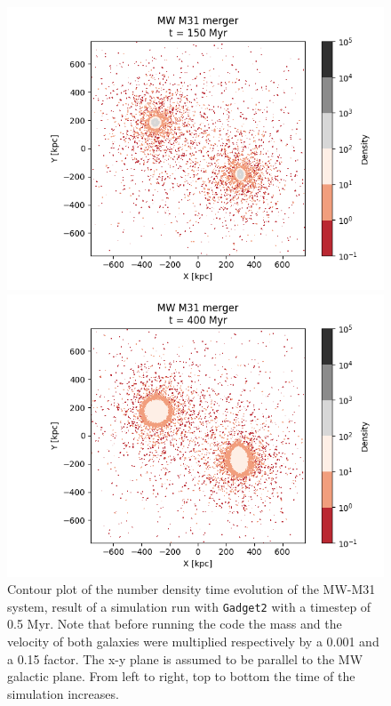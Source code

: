 \documentclass[a4paper,12pt, english]{article}
\begin{document}
\begin{figure}[!ht]
\begin{minipage}{0.45\textwidth}
\includegraphics[width=1\textwidth]{simulations-plots/mw_m31_cmerger_0030.png}
\end{minipage}
\begin{minipage}{0.45\textwidth}
  \centering
\includegraphics[width=1\textwidth]{simulations-plots/mw_m31_cmerger_0080.png}
\end{minipage}
\caption{Contour plot of the number density time evolution of the MW-M31 system, result of a simulation run with \texttt{Gadget2} with a timestep of 0.5 Myr. Note that before running the code the mass and the velocity of both galaxies were multiplied respectively by a 0.001 and a 0.15 factor. The x-y plane is assumed to be parallel to the MW galactic plane. From left to right, top to bottom the time of the simulation increases.} 
\label{fig:mw-m31-merger-evolution}
\end{figure}
\end{document}
